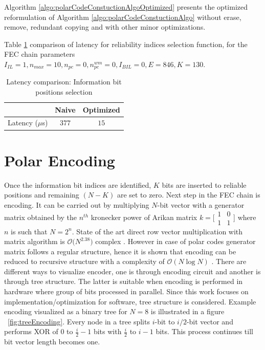 Algorithm \ref{algo:polarCodeConstuctionAlgoOptimized} presents the optimized reformulation of Algorithm \ref{algo:polarCodeConstuctionAlgo} without erase, remove, redundant copying and with other minor optimizations.

Table \ref{tab:codeConstrLatency} comparison of latency for reliability indices selection function, for the FEC chain parameters $I_{IL} = 1, n_{max} = 10, n_{pc} = 0 ,n_{pc}^{wm} = 0, I_{BIL} = 0, E = 846, K = 130$. 
\begin{table}[]
	\begin{center}
		\caption{Latency comparison: Information bit positions selection}
		\label{tab:codeConstrLatency}
		\begin{tabular}{c|c|c} %
			\textbf{ } & Naive & Optimized \\
			\hline
			Latency ($\mu$s) & $377$ & $15$\\
		\end{tabular}
	\end{center}
\end{table}

\section{Polar Encoding}
Once the information bit indices are identified, $K$ bits are inserted to reliable positions and remaining  $(N-K)$ are set to zero. Next step in the FEC chain is encoding. It can be carried out by multiplying $N$-bit vector with a generator matrix obtained by the $n^{th}$ kronecker power of Arikan matrix $k = \big[\begin{smallmatrix} 1 & 0 \\ 1 & 1 \end{smallmatrix}$\big]  where $n$ is such that $N = 2^{n}$. State of the art direct row vector multiplication with matrix algorithm is $\mathcal{O}\big(N^{2.38}\big)$ complex \cite{MatrixMultComplexity}. However in case of polar codes generator matrix follows a regular structure, hence it is shown that encoding can be reduced to recursive structure with a complexity of $\mathcal{O}(N\log{}N)$ \cite{Arikan}. There are different ways to visualize encoder, one is through encoding circuit and another is through tree structure. The latter is suitable when encoding is performed in hardware where group of bits processed in parallel. Since this work focuses on implementation/optimization for software, tree structure is considered. Example encoding visualized as a binary tree for $N = 8$ is illustrated in a figure ~\ref{fig:treeEncoding}. Every node in a tree splits $i$-bit to $i/2$-bit vector and performs XOR of $0$ to $\frac{i}{2}-1$ bits with $\frac{i}{2}$ to $i-1$ bits. This process continues till bit vector length becomes one.

